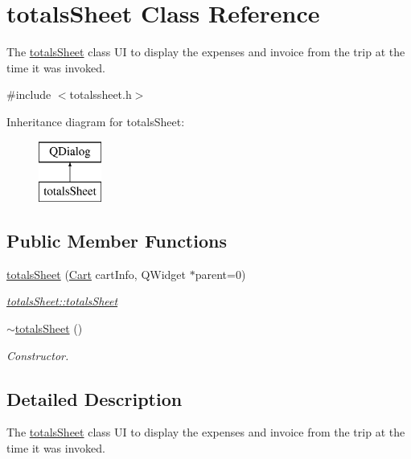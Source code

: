 \hypertarget{classtotals_sheet}{}\section{totals\+Sheet Class Reference}
\label{classtotals_sheet}


The \mbox{\hyperlink{classtotals_sheet}{totals\+Sheet}} class UI to display the expenses and invoice from the trip at the time it was invoked.  




{\ttfamily \#include $<$totalssheet.\+h$>$}

Inheritance diagram for totals\+Sheet\+:\begin{figure}[H]
\begin{center}
\leavevmode
\includegraphics[height=2.000000cm]{classtotals_sheet}
\end{center}
\end{figure}
\subsection*{Public Member Functions}
\begin{DoxyCompactItemize}
\item 
\mbox{\hyperlink{classtotals_sheet_ab5b948f0b74c26fd822be62606d6ac35}{totals\+Sheet}} (\mbox{\hyperlink{class_cart}{Cart}} cart\+Info, Q\+Widget $\ast$parent=0)
\begin{DoxyCompactList}\small\item\em \mbox{\hyperlink{classtotals_sheet_ab5b948f0b74c26fd822be62606d6ac35}{totals\+Sheet\+::totals\+Sheet}} \end{DoxyCompactList}\item 
\mbox{\hyperlink{classtotals_sheet_a77d2ff4b0e0f02a4c05fbfa74bc6df84}{$\sim$totals\+Sheet}} ()
\begin{DoxyCompactList}\small\item\em Constructor. \end{DoxyCompactList}\end{DoxyCompactItemize}


\subsection{Detailed Description}
The \mbox{\hyperlink{classtotals_sheet}{totals\+Sheet}} class UI to display the expenses and invoice from the trip at the time it was invoked. 

